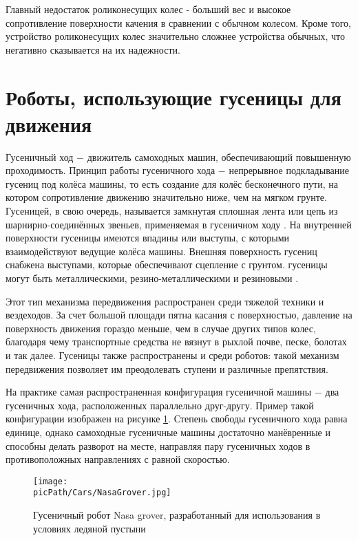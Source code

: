 \documentclass[oneside,final,14pt]{extreport}
\newcommand{\picPath}{img}
\begin{document}
Главный недостаток роликонесущих колес - больший вес и высокое сопротивление поверхности качения в сравнении с обычном колесом. Кроме того, устройство роликонесущих колес значительно сложнее устройства обычных, что негативно сказывается на их надежности.
\section{Роботы, использующие гусеницы для движения}
Гусеничный ход $-$ движитель самоходных машин, обеспечивающий повышенную проходимость. Принцип работы гусеничного хода $-$ непрерывное подкладывание гусениц под колёса машины, то есть создание для колёс бесконечного пути, на котором сопротивление движению значительно ниже, чем на мягком грунте\cite{BigSovietEncycl}. Гусеницей, в свою очередь, называется замкнутая сплошная лента или цепь из шарнирно-соединённых звеньев, применяемая в гусеничном ходу . На внутренней поверхности гусеницы имеются впадины или выступы, с которыми взаимодействуют ведущие колёса машины. Внешняя поверхность гусениц снабжена выступами, которые обеспечивают сцепление с грунтом. гусеницы могут быть металлическими, резино-металлическими и резиновыми \cite{BigSovietEncycl}.

Этот тип механизма передвижения распространен среди тяжелой техники и вездеходов. За счет большой площади пятна касания с поверхностью, давление на поверхность движения гораздо меньше, чем в случае других типов колес, благодаря чему транспортные средства не вязнут в рыхлой почве, песке, болотах и так далее. Гусеницы также распространены и среди роботов: такой механизм передвижения позволяет им преодолевать ступени и различные препятствия. 

На практике самая распространенная конфигурация гусеничной машины $-$ два гусеничных хода, расположенных параллельно друг-другу. Пример такой конфигурации изображен на рисунке \ref{Figure:NasaGrover}. Степень свободы гусеничного хода равна единице, однако самоходные гусеничные машины достаточно манёвренные и  способны делать разворот на месте, направляя пару гусеничных ходов в противоположных направлениях с равной скоростью.

\begin{figure}[H]
\begin{center}
\texttt{[image: \\picPath/Cars/NasaGrover.jpg]}
\end{center}
  \caption{  Гусеничный робот Nasa grover, разработанный для использования в условиях ледяной пустыни }
  \label{Figure:NasaGrover}
\end{figure}
\end{document}
